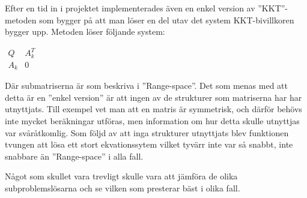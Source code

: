 Efter en tid in i projektet implementerades även en enkel version av ''KKT''-metoden som bygger på att man löser en del utav det system KKT-bivillkoren bygger upp. Metoden löser följande system:

$\begin{matrix}
Q & A_k^T \\
A_k & 0
\end{matrix}$

Där submatriserna är som beskriva i ''Range-space''. Det som menas med att detta är en ''enkel version'' är att ingen av de strukturer som matriserna har har utnyttjats. Till exempel vet man att en matris är symmetrisk, och därför behövs inte mycket beräkningar utföras, men information om hur detta skulle utnyttjas var svåråtkomlig. Som följd av att inga strukturer utnyttjats blev funktionen tvungen att lösa ett stort ekvationssytem vilket tyvärr inte var så snabbt, inte snabbare än ''Range-space'' i alla fall.


Något som skullet vara trevligt skulle vara att jämföra de olika subproblemslösarna och se vilken som presterar bäst i olika fall.
